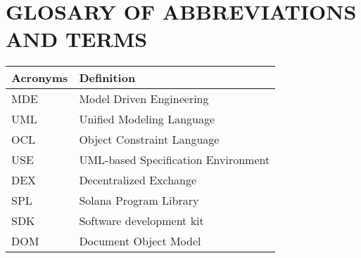 \chapter*{GLOSARY OF ABBREVIATIONS AND TERMS}

\begin{longtable}{|>{\raggedright\arraybackslash}p{4cm}|>{\raggedright\arraybackslash}p{10cm}|}
  \hline
  \textbf{Acronyms}       & \textbf{Definition}           
  \\
  \hline
  MDE                    & Model Driven Engineering  
  \\
  \hline
  UML                    & Unified Modeling Language    
  \\
  \hline
  OCL                    & Object Constraint Language
  \\
  \hline
  USE                    & UML-based Specification Environment
  \\
  \hline
  DEX                    & Decentralized Exchange
  \\
  \hline
  SPL                    & Solana Program Library                
  \\
  \hline
  SDK                    & Software development kit
  \\
  \hline
  DOM                    & Document Object Model 
  \\
  \hline
\end{longtable}